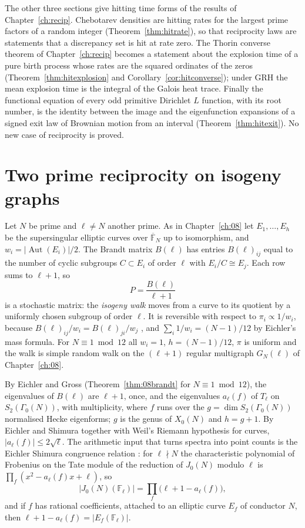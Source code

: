 The other three sections give hitting time forms of the results of Chapter~\ref{ch:recip}. Chebotarev densities are hitting rates for the largest prime factors of a random integer (Theorem~\ref{thm:hitrate}), so that reciprocity laws are statements that a discrepancy set is hit at rate zero. The Thorin converse theorem of Chapter~\ref{ch:recip} becomes a statement about the explosion time of a pure birth process whose rates are the squared ordinates of the zeros (Theorem~\ref{thm:hitexplosion} and Corollary~\ref{cor:hitconverse}); under GRH the mean explosion time is the integral of the Galois heat trace. Finally the functional equation of every odd primitive Dirichlet $L$ function, with its root number, is the identity between the image and the eigenfunction expansions of a signed exit law of Brownian motion from an interval (Theorem~\ref{thm:hitexit}). No new case of reciprocity is proved.

\section{Two prime reciprocity on isogeny graphs}\label{sec:hitisogeny}

Let $N$ be prime and $\ell\ne N$ another prime. As in Chapter~\ref{ch:08} let $E_1,\dots,E_h$ be the supersingular elliptic curves over $\overline{\mathbb F}_N$ up to isomorphism, and $w_i=|\operatorname{Aut}(E_i)|/2$. The Brandt matrix $B(\ell)$ has entries $B(\ell)_{ij}$ equal to the number of cyclic subgroups $C\subset E_i$ of order $\ell$ with $E_i/C\cong E_j$. Each row sums to $\ell+1$, so
\[
P=\frac{B(\ell)}{\ell+1}
\]
is a stochastic matrix: the \emph{isogeny walk} moves from a curve to its quotient by a uniformly chosen subgroup of order $\ell$. It is reversible with respect to $\pi_i\propto1/w_i$, because $B(\ell)_{ij}/w_i=B(\ell)_{ji}/w_j$ \cite{gross1987}, and $\sum_i1/w_i=(N-1)/12$ by Eichler's mass formula. For $N\equiv1\bmod12$ all $w_i=1$, $h=(N-1)/12$, $\pi$ is uniform and the walk is simple random walk on the $(\ell+1)$ regular multigraph $G_N(\ell)$ of Chapter~\ref{ch:08}.

By Eichler and Gross \cite{eichler1954,gross1987} (Theorem~\ref{thm:08brandt} for $N\equiv1\bmod12$), the eigenvalues of $B(\ell)$ are $\ell+1$, once, and the eigenvalues $a_\ell(f)$ of $T_\ell$ on $S_2(\Gamma_0(N))$, with multiplicity, where $f$ runs over the $g=\dim S_2(\Gamma_0(N))$ normalised Hecke eigenforms; $g$ is the genus of $X_0(N)$ and $h=g+1$. By Eichler and Shimura together with Weil's Riemann hypothesis for curves, $|a_\ell(f)|\le2\sqrt\ell$. The arithmetic input that turns spectra into point counts is the Eichler Shimura congruence relation \cite{shimura1971}: for $\ell\nmid N$ the characteristic polynomial of Frobenius on the Tate module of the reduction of $J_0(N)$ modulo $\ell$ is $\prod_f(x^2-a_\ell(f)x+\ell)$, so
\begin{equation}\label{eq:hitjac}
|J_0(N)(\mathbb F_\ell)|=\prod_f\bigl(\ell+1-a_\ell(f)\bigr),
\end{equation}
and if $f$ has rational coefficients, attached to an elliptic curve $E_f$ of conductor $N$, then $\ell+1-a_\ell(f)=|E_f(\mathbb F_\ell)|$.

